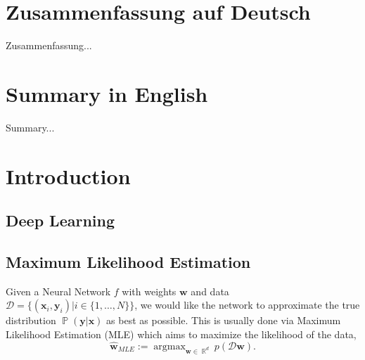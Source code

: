 \documentclass[a4paper, 11pt, oneside]{scrartcl}
\theoremstyle{break}
\DeclareMathOperator*{\argmax}{argmax}
\DeclareMathOperator{\Real}{\mathbb{R}}
\DeclareMathOperator{\Prob}{\mathbb{P}}
\newcommand{\matr}[1]{\boldsymbol{#1}}
\newcommand{\set}[1]{\mathcal{#1}}
\numberwithin{equation}{section}
\begin{document}
	\thispagestyle{empty}
	\section*{Zusammenfassung auf Deutsch}
		Zusammenfassung...

	\section*{Summary in English}
		Summary...
	\newpage

	\thispagestyle{empty}
	\tableofcontents
	\thispagestyle{empty}
	\newpage

	\section{Introduction}
	\setcounter{page}{1}

		\subsection{Deep Learning}

		\subsection{Maximum Likelihood Estimation}
			Given a Neural Network $f$ with weights $\matr{w}$ and data $\set{D} = \{(\matr{x}_i, \matr{y}_i) | i \in \{1, \dots, N\}\}$, we would like the network to approximate the true distribution $\Prob(\matr{y} | \matr{x})$ as best as possible. 
			This is usually done via Maximum Likelihood Estimation (MLE) which aims to maximize the likelihood of the data,
			\begin{equation}
				\matr{\hat{w}}_{MLE} := \argmax_{\matr{w} \in \Real^d} p(\set{D} \matr{w}).
				\label{eqn:MLE}
			\end{equation}
\end{document}
